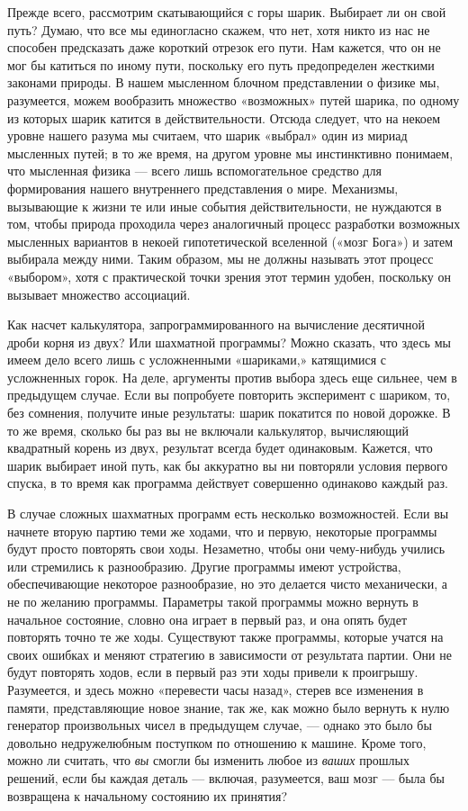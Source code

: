 \documentclass[../main.tex]{subfiles}
\begin{document}
Прежде всего, рассмотрим скатывающийся с горы шарик. Выбирает ли он свой путь? Думаю, что все мы единогласно скажем, что нет, хотя никто из нас не способен предсказать даже короткий отрезок его пути. Нам кажется, что он не мог бы катиться по иному пути, поскольку его путь предопределен жесткими законами природы. В нашем мысленном блочном представлении о физике мы, разумеется, можем вообразить множество «возможных» путей шарика, по одному из которых шарик катится в действительности. Отсюда следует, что на некоем уровне нашего разума мы считаем, что шарик «выбрал» один из мириад мысленных путей; в то же время, на другом уровне мы инстинктивно понимаем, что мысленная физика --- всего лишь вспомогательное средство для формирования нашего внутреннего представления о мире. Механизмы, вызывающие к жизни те или иные события действительности, не нуждаются в том, чтобы природа проходила через аналогичный процесс разработки возможных мысленных вариантов в некоей гипотетической вселенной («мозг Бога») и затем выбирала между ними. Таким образом, мы не должны называть этот процесс «выбором», хотя с практической точки зрения этот термин удобен, поскольку он вызывает множество ассоциаций.

Как насчет калькулятора, запрограммированного на вычисление десятичной дроби корня из двух? Или шахматной программы? Можно сказать, что здесь мы имеем дело всего лишь с усложненными «шариками,» катящимися с усложненных горок. На деле, аргументы против выбора здесь еще сильнее, чем в предыдущем случае. Если вы попробуете повторить эксперимент с шариком, то, без сомнения, получите иные результаты: шарик покатится по новой дорожке. В то же время, сколько бы раз вы не включали калькулятор, вычисляющий квадратный корень из двух, результат всегда будет одинаковым. Кажется, что шарик выбирает иной путь, как бы аккуратно вы ни повторяли условия первого спуска, в то время как программа действует совершенно одинаково каждый раз.

В случае сложных шахматных программ есть несколько возможностей. Если вы начнете вторую партию теми же ходами, что и первую, некоторые программы будут просто повторять свои ходы. Незаметно, чтобы они чему-нибудь учились или стремились к разнообразию. Другие программы имеют устройства, обеспечивающие некоторое разнообразие, но это делается чисто механически, а не по желанию программы. Параметры такой программы можно вернуть в начальное состояние, словно она играет в первый раз, и она опять будет повторять точно те же ходы. Существуют также программы, которые учатся на своих ошибках и меняют стратегию в зависимости от результата партии. Они не будут повторять ходов, если в первый раз эти ходы привели к проигрышу. Разумеется, и здесь можно «перевести часы назад», стерев все изменения в памяти, представляющие новое знание, так же, как можно было вернуть к нулю генератор произвольных чисел в предыдущем случае, --- однако это было бы довольно недружелюбным поступком по отношению к машине. Кроме того, можно ли считать, что \emph{вы} смогли бы изменить любое из \emph{ваших} прошлых решений, если бы каждая деталь --- включая, разумеется, ваш мозг --- была бы возвращена к начальному состоянию их принятия?
\end{document}

